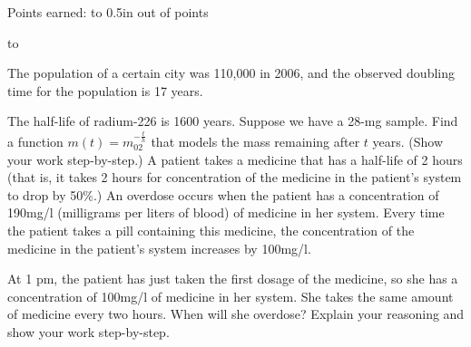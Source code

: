 \documentclass[12pt,answers]{exam}
\begin{document}
\pagestyle{headandfoot}


\runningheadrule
{} 



\firstpagefooter{} %
                {}
                {Points earned: \hbox to 0.5in{\hrulefill}
                 out of  \pointsonpage{\thepage} points}
                 
						

\hbox to 
\vspace{0.1in}





\begin{questions}


\addpoints

\question The population of a certain city was 110,000 in 2006, and the observed doubling time for the population is 17 years.
\question[2] The half-life of radium-226 is 1600 years. Suppose we have a 28-mg sample.
Find a function 
$\displaystyle m(t) = m_02^{-\frac{t}{h}}$
 that models the mass remaining after $t$ years. (Show your work step-by-step.)
 \fillwithdottedlines{2.5cm}
 \question[2] A patient takes a medicine that has a half-life of 2 hours (that is, it takes 2 hours for concentration of the medicine in the patient's system to drop by 50\%.) An overdose occurs when the patient has a  concentration of 190mg/l (milligrams per liters of blood) of medicine in her system. Every time the patient takes a pill containing this medicine, the concentration of the medicine in the patient's system increases by 100mg/l.

At 1 pm, the patient has just taken the first dosage of the medicine, so she has a concentration of 100mg/l of medicine in her system. She takes the same amount of medicine every two hours. When will she overdose? Explain your reasoning and show your work step-by-step. 
\fillwithdottedlines{4cm}

	

\end{questions}
\end{document}
